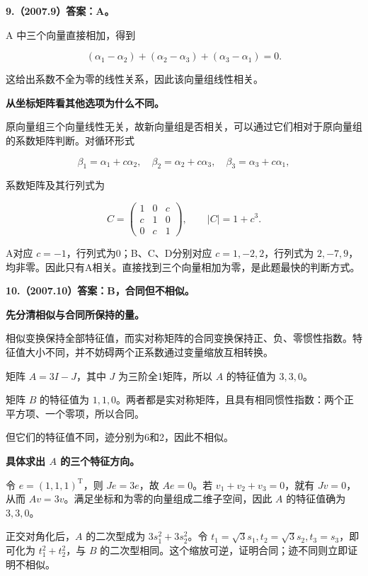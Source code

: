 \documentclass[UTF8,11pt,fontset=windows]{ctexart}
\begin{document}
\clearpage

\textbf{9.（2007.9）答案：A。}

A 中三个向量直接相加，得到

$$
(\alpha_1-\alpha_2)+(\alpha_2-\alpha_3)+(\alpha_3-\alpha_1)=0.
$$

这给出系数不全为零的线性关系，因此该向量组线性相关。

\textbf{从坐标矩阵看其他选项为什么不同。}

原向量组三个向量线性无关，故新向量组是否相关，可以通过它们相对于原向量组的系数矩阵判断。对循环形式

$$
\beta_1=\alpha_1+c\alpha_2,\quad
\beta_2=\alpha_2+c\alpha_3,\quad
\beta_3=\alpha_3+c\alpha_1,
$$

系数矩阵及其行列式为

$$
C=\begin{pmatrix}1&0&c\\c&1&0\\0&c&1\end{pmatrix},
\qquad|C|=1+c^3.
$$

A对应 $c=-1$，行列式为0；B、C、D分别对应 $c=1,-2,2$，行列式为 $2,-7,9$，均非零。因此只有A相关。直接找到三个向量相加为零，是此题最快的判断方式。

\clearpage

\textbf{10.（2007.10）答案：B，合同但不相似。}

\textbf{先分清相似与合同所保持的量。}

相似变换保持全部特征值，而实对称矩阵的合同变换保持正、负、零惯性指数。特征值大小不同，并不妨碍两个正系数通过变量缩放互相转换。

矩阵 $A=3I-J$，其中 $J$ 为三阶全1矩阵，所以 $A$ 的特征值为 $3,3,0$。

矩阵 $B$ 的特征值为 $1,1,0$。两者都是实对称矩阵，且具有相同惯性指数：两个正平方项、一个零项，所以合同。

但它们的特征值不同，迹分别为6和2，因此不相似。

\textbf{具体求出 $A$ 的三个特征方向。}

令 $e=(1,1,1)^{\mathrm T}$，则 $Je=3e$，故 $Ae=0$。若 $v_1+v_2+v_3=0$，就有 $Jv=0$，从而 $Av=3v$。满足坐标和为零的向量组成二维子空间，因此 $A$ 的特征值确为 $3,3,0$。

正交对角化后，$A$ 的二次型成为 $3s_1^2+3s_2^2$。令 $t_1=\sqrt3s_1,t_2=\sqrt3s_2,t_3=s_3$，即可化为 $t_1^2+t_2^2$，与 $B$ 的二次型相同。这个缩放可逆，证明合同；迹不同则立即证明不相似。
\end{document}
